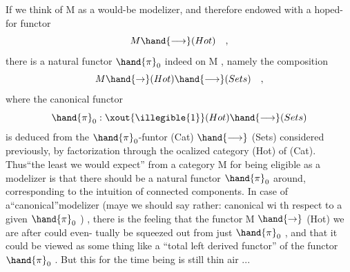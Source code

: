 If we think of M as a would-be modelizer,  and therefore endowed with
a hoped-for functor
\[ M \hand{\longrightarrow} (Hot) \quad , \]
there is a natural functor $\hand{\pi}_0$ indeed on M ,  namely the composition
\[ M \hand{\rightarrow} (Hot) \hand{\longrightarrow} (Sets) \quad , \]
where the canonical functor
\[ \hand{\pi}_0 :\xout{\illegible{1}}(Hot) \hand{\longrightarrow} (Sets) \]
is deduced from the $\hand{\pi}_0$-funtor (Cat) $\hand{\longrightarrow}$ (Sets)  considered previously,
by factorization through the ocalized category (Hot) of (Cat).  Thus``the
least we would expect'' from a category M for being eligible as a modelizer\unsure{,}
is that there should be a natural functor $\hand{\pi}_0$ around,  corresponding to the
intuition of connected components.  In case of a``canonical''modelizer  
(maye we should say rather:  canonical wi th respect to a given $\hand{\pi}_0$ ) ,
there is the feeling that the functor  M $\hand{\rightarrow}$ (Hot)  we are after could even-%
tually be squeezed out from just $\hand{\pi}_0$ ,  and that it could be viewed as some%
thing like a ``total left derived functor'' of the functor $\hand{\pi}_0$ .  But this
for the time being is still thin air ...

